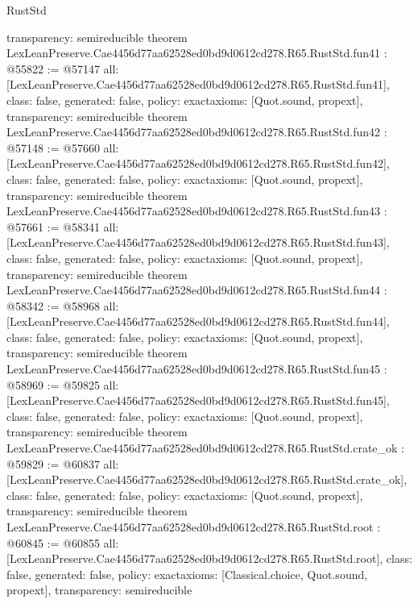 \begin{lexlean}{RustStd}
\begin{coremodule}
{  transparency: semireducible
}
theorem LexLeanPreserve.Cae4456d77aa62528ed0bd9d0612cd278.R65.RustStd.fun41 : @55822 := @57147 {
  all: [LexLeanPreserve.Cae4456d77aa62528ed0bd9d0612cd278.R65.RustStd.fun41],
  class: false,
  generated: false,
  policy: exact{axioms: [Quot.sound, propext]},
  transparency: semireducible
}
theorem LexLeanPreserve.Cae4456d77aa62528ed0bd9d0612cd278.R65.RustStd.fun42 : @57148 := @57660 {
  all: [LexLeanPreserve.Cae4456d77aa62528ed0bd9d0612cd278.R65.RustStd.fun42],
  class: false,
  generated: false,
  policy: exact{axioms: [Quot.sound, propext]},
  transparency: semireducible
}
theorem LexLeanPreserve.Cae4456d77aa62528ed0bd9d0612cd278.R65.RustStd.fun43 : @57661 := @58341 {
  all: [LexLeanPreserve.Cae4456d77aa62528ed0bd9d0612cd278.R65.RustStd.fun43],
  class: false,
  generated: false,
  policy: exact{axioms: [Quot.sound, propext]},
  transparency: semireducible
}
theorem LexLeanPreserve.Cae4456d77aa62528ed0bd9d0612cd278.R65.RustStd.fun44 : @58342 := @58968 {
  all: [LexLeanPreserve.Cae4456d77aa62528ed0bd9d0612cd278.R65.RustStd.fun44],
  class: false,
  generated: false,
  policy: exact{axioms: [Quot.sound, propext]},
  transparency: semireducible
}
theorem LexLeanPreserve.Cae4456d77aa62528ed0bd9d0612cd278.R65.RustStd.fun45 : @58969 := @59825 {
  all: [LexLeanPreserve.Cae4456d77aa62528ed0bd9d0612cd278.R65.RustStd.fun45],
  class: false,
  generated: false,
  policy: exact{axioms: [Quot.sound, propext]},
  transparency: semireducible
}
theorem LexLeanPreserve.Cae4456d77aa62528ed0bd9d0612cd278.R65.RustStd.crate_ok : @59829 := @60837 {
  all: [LexLeanPreserve.Cae4456d77aa62528ed0bd9d0612cd278.R65.RustStd.crate_ok],
  class: false,
  generated: false,
  policy: exact{axioms: [Quot.sound, propext]},
  transparency: semireducible
}
theorem LexLeanPreserve.Cae4456d77aa62528ed0bd9d0612cd278.R65.RustStd.root : @60845 := @60855 {
  all: [LexLeanPreserve.Cae4456d77aa62528ed0bd9d0612cd278.R65.RustStd.root],
  class: false,
  generated: false,
  policy: exact{axioms: [Classical.choice, Quot.sound, propext]},
  transparency: semireducible
}


\end{coremodule}
\end{lexlean}
